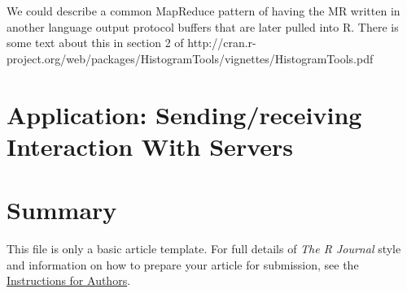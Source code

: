 We could describe a common MapReduce pattern of having the MR written
in another language output protocol buffers that are later pulled into
R.  There is some text about this in section 2 of
http://cran.r-project.org/web/packages/HistogramTools/vignettes/HistogramTools.pdf 

\section{Application: Sending/receiving Interaction With Servers}

\section{Summary}

This file is only a basic article template. For full details of \emph{The R Journal} style and information on how to prepare your article for submission, see the \href{http://journal.r-project.org/latex/RJauthorguide.pdf}{Instructions for Authors}.



\address{Author One\\
  Affiliation\\
  Address\\
  Country}

\address{Author Two\\
  Affiliation\\
  Address\\
  Country}

\address{Murray Stokely\\
  Google, Inc.\\
  1600 Amphitheatre Parkway\\
  Mountain View, CA 94043\\
  USA}
